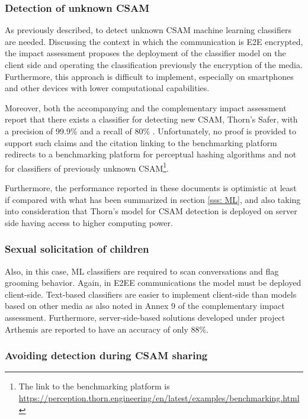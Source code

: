 \subsubsection{Detection of unknown CSAM}

As previously described, to detect unknown CSAM machine learning classifiers are needed. Discussing the context in which the communication is E2E encrypted, the impact assessment proposes the deployment of the classifier model on the client side and operating the classification previously the encryption of the media. Furthermore, this approach is difficult to implement, especially on smartphones and other devices with lower computational capabilities. 

Moreover, both the accompanying and the complementary impact assessment report that there exists a classifier for detecting new CSAM, Thorn's Safer, with a precision of 99.9\% and a recall of 80\%\cite{eu2022impact} \cite{eu2023impact}. Unfortunately, no proof is provided to support such claims and the citation linking to the benchmarking platform redirects to a benchmarking platform for perceptual hashing algorithms and not for classifiers of previously unknown CSAM\footnote{The link to the benchmarking platform is\\ \url{https://perception.thorn.engineering/en/latest/examples/benchmarking.html}}.

Furthermore, the performance reported in these documents is optimistic at least if compared with what has been summarized in section \ref{sss: ML}, and also taking into consideration that Thorn's model for CSAM detection is deployed on server side\cite{Thorn} having access to higher computing power.

\subsubsection{Sexual solicitation of children}

Also, in this case, ML classifiers are required to scan conversations and flag grooming behavior. Again, in E2EE communications the model must be deployed client-side. Text-based classifiers are easier to implement client-side than models based on other media as also noted in Annex 9 of the complementary impact assessment\cite{eu2022impact}. Furthermore, server-side-based solutions developed under project Arthemis are reported to have an accuracy of only 88\%\cite{eu2022impact}.

\subsubsection{Avoiding detection during CSAM sharing}
\label{sss:avoid_detection}

